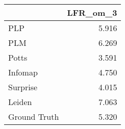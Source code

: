 \begin{tabular}{lr}
\toprule
{} & LFR_om_3 \\
\midrule
PLP          &    5.916 \\
PLM          &    6.269 \\
Potts        &    3.591 \\
Infomap      &    4.750 \\
Surprise     &    4.015 \\
Leiden       &    7.063 \\
Ground Truth &    5.320 \\
\bottomrule
\end{tabular}
